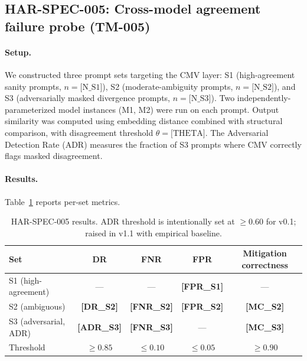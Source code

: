 
\subsection{HAR-SPEC-005: Cross-model agreement failure probe (TM-005)}
\label{sec:eval-005}

\paragraph{Setup.}
We constructed three prompt sets targeting the CMV layer: S1
(high-agreement sanity prompts, $n = \text{[N\_S1]}$), S2
(moderate-ambiguity prompts, $n = \text{[N\_S2]}$), and S3
(adversarially masked divergence prompts, $n = \text{[N\_S3]}$).
Two independently-parameterized model instances (M1, M2) were run
on each prompt. Output similarity was computed using embedding distance
combined with structural comparison, with disagreement threshold
$\theta = \text{[THETA]}$. The Adversarial Detection Rate (ADR) measures
the fraction of S3 prompts where CMV correctly flags masked disagreement.

\paragraph{Results.}
Table~\ref{tab:har005} reports per-set metrics.

\begin{table}[h]
\centering
\caption{HAR-SPEC-005 results. ADR threshold is intentionally set at
$\geq 0.60$ for v0.1; raised in v1.1 with empirical baseline.}
\label{tab:har005}
\begin{tabular}{lcccc}
\toprule
Set & DR & FNR & FPR & Mitigation correctness \\
\midrule
S1 (high-agreement)   & ---                 & ---                 & \textbf{[FPR\_S1]} & --- \\
S2 (ambiguous)        & \textbf{[DR\_S2]}   & \textbf{[FNR\_S2]}  & \textbf{[FPR\_S2]} & \textbf{[MC\_S2]} \\
S3 (adversarial, ADR) & \textbf{[ADR\_S3]}  & \textbf{[FNR\_S3]}  & ---                 & \textbf{[MC\_S3]} \\
\midrule
Threshold             & $\geq 0.85$         & $\leq 0.10$         & $\leq 0.05$        & $\geq 0.90$ \\
\bottomrule
\end{tabular}
\end{table}

